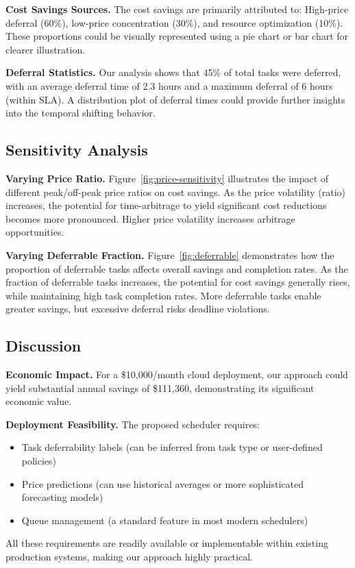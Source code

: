 \documentclass[10pt,conference]{IEEEtran}
\begin{document}
\textbf{Cost Savings Sources.} The cost savings are primarily attributed to: High-price deferral (60\%), low-price concentration (30\%), and resource optimization (10\%). These proportions could be visually represented using a pie chart or bar chart for clearer illustration.

\textbf{Deferral Statistics.} Our analysis shows that 45\% of total tasks were deferred, with an average deferral time of 2.3 hours and a maximum deferral of 6 hours (within SLA). A distribution plot of deferral times could provide further insights into the temporal shifting behavior.

\subsection{Sensitivity Analysis}

\textbf{Varying Price Ratio.} Figure~\ref{fig:price-sensitivity} illustrates the impact of different peak/off-peak price ratios on cost savings. As the price volatility (ratio) increases, the potential for time-arbitrage to yield significant cost reductions becomes more pronounced. Higher price volatility increases arbitrage opportunities.





\textbf{Varying Deferrable Fraction.} Figure~\ref{fig:deferrable} demonstrates how the proportion of deferrable tasks affects overall savings and completion rates. As the fraction of deferrable tasks increases, the potential for cost savings generally rises, while maintaining high task completion rates. More deferrable tasks enable greater savings, but excessive deferral risks deadline violations.




\subsection{Discussion}

\textbf{Economic Impact.} For a \$10,000/month cloud deployment, our approach could yield substantial annual savings of \$111,360, demonstrating its significant economic value.

\textbf{Deployment Feasibility.} The proposed scheduler requires:
\begin{itemize}
    \item Task deferrability labels (can be inferred from task type or user-defined policies)
    \item Price predictions (can use historical averages or more sophisticated forecasting models)
    \item Queue management (a standard feature in most modern schedulers)
\end{itemize}
All these requirements are readily available or implementable within existing production systems, making our approach highly practical.
\end{document}
